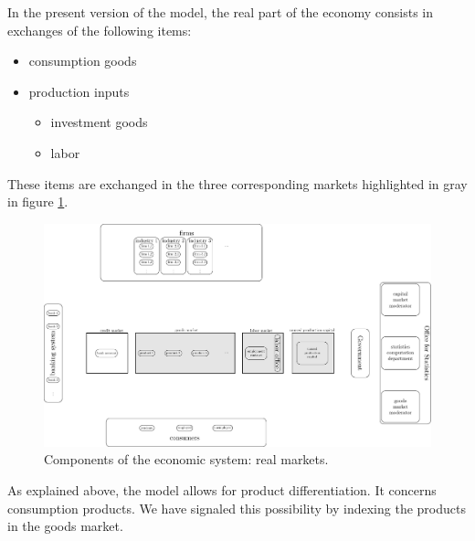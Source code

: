 \documentclass{book}
\begin{document}
In the present version of the model, the real part of the economy consists in exchanges of the following items:
\begin{itemize}
	\item consumption goods
	\item production inputs
		\begin{itemize}
			\item investment goods
			\item labor
		\end{itemize}
\end{itemize}

These items are exchanged in the three corresponding markets highlighted in gray in figure \ref{fig:componentsc2}.


\begin{figure}[htp]
\hskip-1cm\includegraphics[scale=0.5]{agents_and_interactions_figure1c2-0.pdf}
	\caption{Components of the economic system: real markets.}
	\label{fig:componentsc2}
\end{figure}

As explained above, the model allows for product differentiation. It concerns consumption products. We have signaled this possibility by indexing the products in the goods market.
\end{document}
